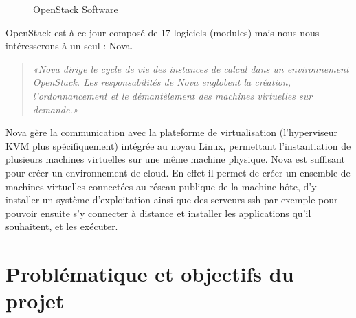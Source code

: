 \documentclass{report}
\begin{document}
        \begin{figure}[H]
            \caption{OpenStack Software \cite{openstack_software}}
        \end{figure}


        OpenStack est à ce jour composé de 17 logiciels (modules) mais nous nous intéresserons à un seul : Nova.
        \begin{quote}
            \textit{«Nova dirige le cycle de vie des instances de calcul dans un environnement OpenStack. Les responsabilités de Nova englobent la création, l'ordonnancement et le démantèlement des machines virtuelles sur demande.» \cite{openstack_nova}}
        \end{quote}

        \bigbreak

        Nova gère la communication avec la plateforme de virtualisation (l'hyperviseur KVM plus spécifiquement) intégrée au noyau Linux, permettant l'instantiation de plusieurs machines virtuelles sur une même machine physique.
        Nova est suffisant pour créer un environnement de cloud. En effet il permet de créer un ensemble de machines virtuelles connectées au réseau publique de la machine hôte, d'y installer un système d'exploitation ainsi que des serveurs ssh par exemple pour pouvoir ensuite s'y connecter à distance et installer les applications qu'il souhaitent, et les exécuter.

    \section{Problématique et objectifs du projet}
\end{document}

